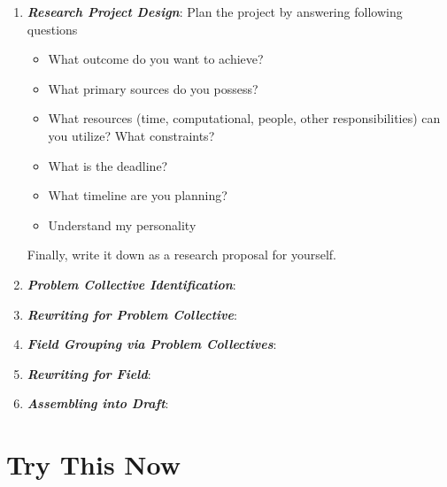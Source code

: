 \documentclass[11pt]{article}
\begin{document}
\begin{itemize}
\begin{enumerate}
\item  \emph{\textbf{Research Project Design}}: Plan the project by answering following questions
\begin{itemize}
\item What outcome do you want to achieve? 
\item What primary sources do you possess? 
\item What resources (time, computational, people, other responsibilities) can you utilize? What constraints? 
\item What is the deadline? 
\item What timeline are you planning?
\item Understand my personality
\end{itemize} Finally, write it down as a research proposal for yourself.

\item  \emph{\textbf{Problem Collective Identification}}:

\item  \emph{\textbf{Rewriting for Problem Collective}}:

\item  \emph{\textbf{Field Grouping via Problem Collectives}}:

\item  \emph{\textbf{Rewriting for Field}}:

\item  \emph{\textbf{Assembling into Draft}}:
\end{enumerate}
\end{itemize}


\newpage
\section{Try This Now}
\end{document}
